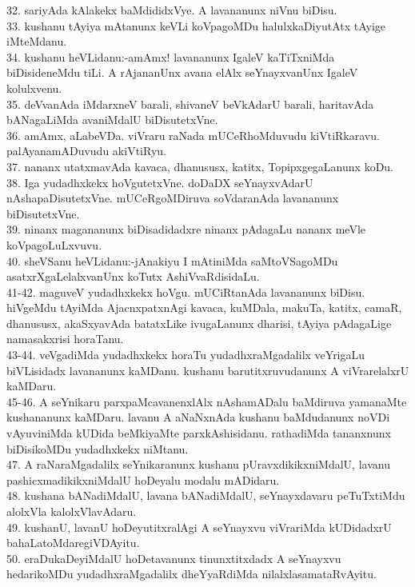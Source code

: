 \documentclass{article}
\begin{document}
32. sariyAda kAlakekx baMdididxVye. A lavananunx niVnu biDisu.\\
33. kushanu tAyiya mAtanunx keVLi koVpagoMDu halulxkaDiyutAtx tAyige iMteMdanu.\\
34. kushanu heVLidanu:-amAmx! lavananunx IgaleV kaTiTxniMda biDisideneMdu tiLi. A rAjananUnx avana elAlx seYnayxvanUnx IgaleV kolulxvenu.\\
35. deVvanAda iMdarxneV barali, shivaneV beVkAdarU barali, haritavAda bANagaLiMda avaniMdalU biDisutetxVne.\\
36. amAmx, aLabeVDa. viVraru raNada mUCeRhoMduvudu kiVtiRkaravu. palAyanamADuvudu akiVtiRyu.\\
37. nananx utatxmavAda kavaca, dhanususx, katitx, TopipxgegaLanunx koDu.\\
38. Iga yudadhxkekx hoVgutetxVne. doDaDX seYnayxvAdarU nAshapaDisutetxVne. mUCeRgoMDiruva soVdaranAda lavananunx biDisutetxVne.\\
39. ninanx magananunx biDisadidadxre ninanx pAdagaLu nananx meVle koVpagoLuLxvuvu.\\
40. sheVSanu heVLidanu:-jAnakiyu I mAtiniMda saMtoVSagoMDu asatxrXgaLelalxvanUnx koTutx AshiVvaRdisidaLu.\\
41-42. maguveV yudadhxkekx hoVgu. mUCiRtanAda lavananunx biDisu. hiVgeMdu tAyiMda AjacnxpatxnAgi kavaca, kuMDala, makuTa, katitx, camaR, dhanususx, akaSxyavAda batatxLike ivugaLanunx dharisi, tAyiya pAdagaLige namasakxrisi horaTanu.\\
43-44. veVgadiMda yudadhxkekx horaTu yudadhxraMgadalilx veYrigaLu biVLisidadx lavananunx kaMDanu. kushanu barutitxruvudanunx A viVrarelalxrU kaMDaru.\\
45-46. A seYnikaru parxpaMcavanenxlAlx nAshamADalu baMdiruva yamanaMte kushananunx kaMDaru. lavanu A aNaNxnAda kushanu baMdudanunx noVDi vAyuviniMda kUDida beMkiyaMte parxkAshisidanu. rathadiMda tananxnunx biDisikoMDu yudadhxkekx niMtanu.\\
47. A raNaraMgadalilx seYnikaranunx kushanu pUravxdikikxniMdalU, lavanu pashicxmadikikxniMdalU hoDeyalu modalu mADidaru.\\
48. kushana bANadiMdalU, lavana bANadiMdalU, seYnayxdavaru peTuTxtiMdu alolxVla kalolxVlavAdaru.\\
49. kushanU, lavanU hoDeyutitxralAgi A seYnayxvu viVrariMda kUDidadxrU bahaLatoMdaregiVDAyitu.\\
50. eraDukaDeyiMdalU hoDetavanunx tinunxtitxdadx A seYnayxvu hedarikoMDu yudadhxraMgadalilx dheYyaRdiMda nilalxlasamataRvAyitu.\\
\end{document}
